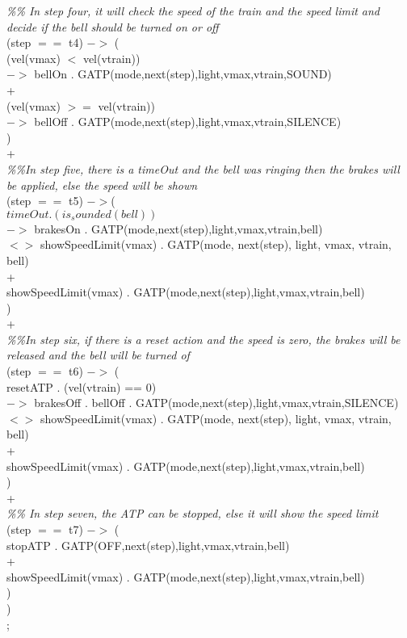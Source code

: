 \documentclass[11pt,a4paper]{article}
\begin{document}
	\textit{\%\% In step four, it will check the speed of the train and the speed limit and decide if the bell should be turned on or off}\\
				(step $==$ t4) $->$ (\\
					(vel(vmax) $<$ vel(vtrain))\\
						$->$ bellOn . GATP(mode,next(step),light,vmax,vtrain,SOUND)\\
					+		\\
					(vel(vmax) $>=$ vel(vtrain))\\
						$->$ bellOff . GATP(mode,next(step),light,vmax,vtrain,SILENCE)\\
					)\\
				+\\
\textit{\%\%In step five, there is a timeOut and the bell was ringing then the brakes will be applied, else the speed will be shown}\\
				(step $==$ t5) $-> $(\\
				$	timeOut . (is_sounded(bell))$\\
						$->$ brakesOn . GATP(mode,next(step),light,vmax,vtrain,bell)\\
						$<>$ showSpeedLimit(vmax) . GATP(mode, next(step), light, vmax, vtrain, bell)\\
					+		\\
					showSpeedLimit(vmax) . GATP(mode,next(step),light,vmax,vtrain,bell)\\
					)\\
				+\\
 
\textit{\%\%In step six, if there is a reset action and the speed is zero, the brakes will be released and the bell will be turned of}\\

				(step $==$ t6) $->$ (\\
					resetATP . (vel(vtrain) == 0)\\
						$->$ brakesOff . bellOff . GATP(mode,next(step),light,vmax,vtrain,SILENCE)\\
						$<>$ showSpeedLimit(vmax) . GATP(mode, next(step), light, vmax, vtrain, bell)\\
					+		\\
					showSpeedLimit(vmax) . GATP(mode,next(step),light,vmax,vtrain,bell) \\
					)\\
				+\\
\textit{\%\% In step seven, the ATP can be stopped, else it will show the speed limit}\\
				(step $==$ t7) $->$ (\\
					stopATP . GATP(OFF,next(step),light,vmax,vtrain,bell)\\
					+\\
					showSpeedLimit(vmax) . GATP(mode,next(step),light,vmax,vtrain,bell)\\
					)\\
			)\\
		;\\
	
\end{document}
